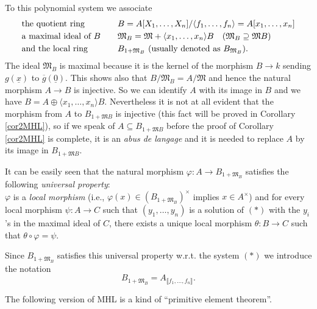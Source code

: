 \documentclass[11pt,a4paper,twoside]{article}
\newcommand \ov[1]{\overline{#1}}
\newcommand \und[1]{\underline{#1}}
\newcommand{\gothic}{\mathfrak}
\newcommand{\fM}{{\gothic M}}
\newcommand\gen[1]{{\langle #1 \rangle}}
\newcommand\lrb[1] {\llbracket #1 \rrbracket}
\newcommand\Afn {A_{\lrb{f_1,\dots,f_n}}}
\begin{document}
\smallskip 
To this polynomial system we associate
\[ 
\begin{array}{lll} 
\hbox{the quotient ring}  &&  B=A[X_1,\dots,X_n]/\gen{f_1,\dots,f_n}=A[x_1,\dots,x_n]   \\[1mm] 
\hbox{a maximal ideal of $B$}  &&  \fM_B=\fM +\gen{x_1,\dots,x_n} B \quad (\fM_B\supseteq \fM B)   \\[1mm] 
\hbox{and the local ring}  &&   B_{1+\fM_B}  \hbox{ (usually denoted as } B_{\fM_B}).  
 \end{array}
\]
The ideal $\fM_B$ is maximal because it is the kernel of the morphism
$B\to k$ sending $g(\und x)$ to $\ov g(\und 0)$. This shows also that
 $B/\fM_B=A/\fM$ and hence the natural morphism $A\to B$ is injective.
 So we can identify $A$ with its image in $B$ and we have $B=A\oplus \gen{x_1,\dots,x_n} B$. 
Nevertheless it is not at all evident that the morphism from $A$ to $B_{1+\fM B}$ is injective (this fact will be proved in Corollary \ref{cor2MHL}), so if we speak of $A\subseteq B_{1+\fM B}$ before the proof of Corollary \ref{cor2MHL} is complete, it is an \emph{abus de langage} and it is needed to replace $A$ by its image in
$B_{1+\fM B}$.

It can be easily seen that the natural morphism $\varphi:A\to B_{1+\fM_B}$ satisfies the following \emph{universal property}: 
\\
$\varphi$ is a \emph{local morphism} (i.e., $\varphi(x)\in (B_{1+\fM_B})^{\times }$ implies $x\in A^{\times }$) and for every local morphism $\psi:A\to C$  
such that $(y_1,\dots,y_n)$ is a solution of $(*)$ with the $y_i$'s in the maximal ideal of  $C$,  there exists a unique local morphism $\theta:B\to C$ such that
$\theta\circ \varphi=\psi$.

Since $B_{1+\fM_B}$ satisfies this universal property w.r.t. the system $(*)$
we introduce the notation
$$ B_{1+\fM_B} = \Afn.
$$


The following version of MHL is a kind of ``primitive element theorem''.
\end{document}
